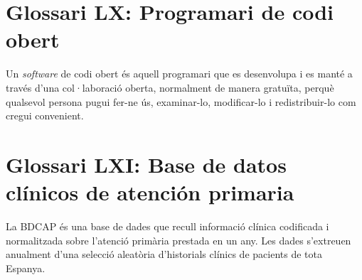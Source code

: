 \documentclass[a4paper,12pt]{report}
\begin{document}
\section*{Glossari LX: Programari de codi obert}
Un \textit{software} de codi obert és aquell programari que es desenvolupa i es manté a través d'una col·laboració oberta, normalment de manera gratuïta, perquè qualsevol persona pugui fer-ne ús, examinar-lo, modificar-lo i redistribuir-lo com cregui convenient.
\section*{Glossari LXI: Base de datos clínicos de atención primaria}
La BDCAP és  una base de dades que recull informació clínica codificada i normalitzada sobre l'atenció  primària prestada en un any. Les dades s'extreuen anualment d'una selecció aleatòria d'historials clínics de pacients de tota Espanya.
\end{document}
